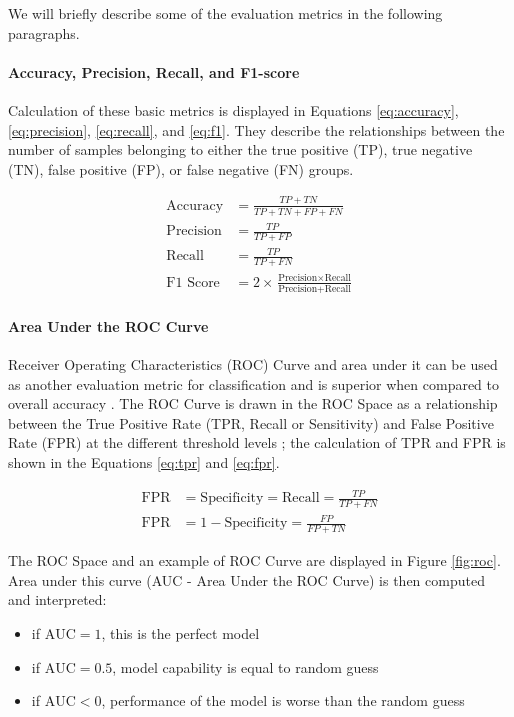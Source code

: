 We will briefly describe some of the evaluation metrics in the following paragraphs. 

\paragraph{Accuracy, Precision, Recall, and F1-score} Calculation of these basic metrics is displayed in Equations \ref{eq:accuracy}, \ref{eq:precision}, \ref{eq:recall}, and \ref{eq:f1}. They describe the relationships between the number of samples belonging to either the true positive (TP), true negative (TN), false positive (FP), or false negative (FN) groups.

\begin{align}
\label{eq:accuracy}
\text{Accuracy} &= \frac{TP + TN}{TP + TN + FP + FN} \\
\label{eq:precision}
\text{Precision} &= \frac{TP}{TP + FP} \\
\label{eq:recall}
\text{Recall} &= \frac{TP}{TP + FN} \\
\label{eq:f1}
\text{F1\ Score} &= 2 \!\times\! \frac{\text{Precision} \!\times\! \text{Recall}}{\text{Precision} + \text{Recall}}
\end{align}

\paragraph{Area Under the ROC Curve}
Receiver Operating Characteristics (ROC) Curve and area under it can be used as another evaluation metric for classification and is superior when compared to overall accuracy \cite{Bradley1997}. The ROC Curve is drawn in the ROC Space as a relationship between the True Positive Rate (TPR, Recall or Sensitivity) and False Positive Rate (FPR) at the different threshold levels \cite{Bradley1997, Nahm2022, Fawcett2006}; the calculation of TPR and FPR is shown in the Equations \ref{eq:tpr} and \ref{eq:fpr}.

\begin{align}
\label{eq:tpr}
\text{FPR} &=\text{Specificity} = \text{Recall} = \frac{TP}{TP + FN} \\
\label{eq:fpr}
\text{FPR} &= 1-\text{Specificity} = \frac{FP}{FP + TN}
\end{align}

The ROC Space and an example of ROC Curve are displayed in Figure \ref{fig:roc}. Area under this curve (AUC - Area Under the ROC Curve) is then computed and interpreted:

\begin{itemize}
    \item if $\text{AUC} = 1$, this is the perfect model
    \item if $\text{AUC} = 0.5$, model capability is equal to random guess
    \item if $\text{AUC} < 0$, performance of the model is worse than the random guess
\end{itemize}

